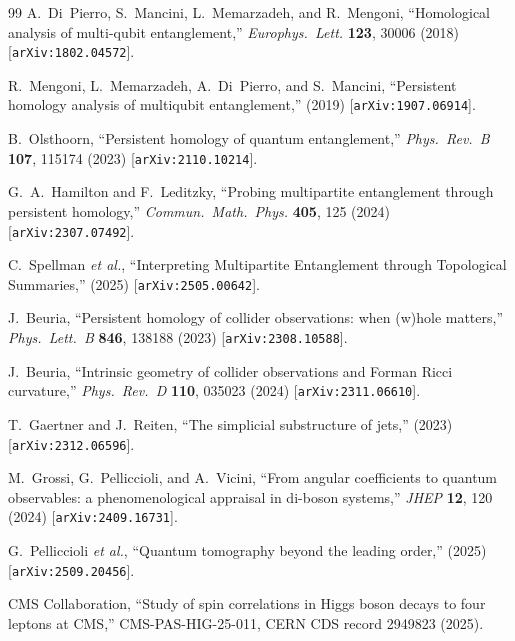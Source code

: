 \documentclass[11pt,a4paper]{article}
\theoremstyle{definition}
\begin{document}
\begin{thebibliography}{99}
A.~Di~Pierro, S.~Mancini, L.~Memarzadeh, and R.~Mengoni, ``Homological analysis of multi-qubit entanglement,'' \emph{Europhys.~Lett.} \textbf{123}, 30006 (2018) [\texttt{arXiv:1802.04572}].

R.~Mengoni, L.~Memarzadeh, A.~Di~Pierro, and S.~Mancini, ``Persistent homology analysis of multiqubit entanglement,'' (2019) [\texttt{arXiv:1907.06914}].

B.~Olsthoorn, ``Persistent homology of quantum entanglement,'' \emph{Phys.~Rev.~B} \textbf{107}, 115174 (2023) [\texttt{arXiv:2110.10214}].

G.~A.~Hamilton and F.~Leditzky, ``Probing multipartite entanglement through persistent homology,'' \emph{Commun.~Math.~Phys.} \textbf{405}, 125 (2024) [\texttt{arXiv:2307.07492}].

C.~Spellman \emph{et al.}, ``Interpreting Multipartite Entanglement through Topological Summaries,'' (2025) [\texttt{arXiv:2505.00642}].


J.~Beuria, ``Persistent homology of collider observations: when (w)hole matters,'' \emph{Phys.~Lett.~B} \textbf{846}, 138188 (2023) [\texttt{arXiv:2308.10588}].

J.~Beuria, ``Intrinsic geometry of collider observations and Forman Ricci curvature,'' \emph{Phys.~Rev.~D} \textbf{110}, 035023 (2024) [\texttt{arXiv:2311.06610}].

T.~Gaertner and J.~Reiten, ``The simplicial substructure of jets,'' (2023) [\texttt{arXiv:2312.06596}].


M.~Grossi, G.~Pelliccioli, and A.~Vicini, ``From angular coefficients to quantum observables: a phenomenological appraisal in di-boson systems,'' \emph{JHEP} \textbf{12}, 120 (2024) [\texttt{arXiv:2409.16731}].

G.~Pelliccioli \emph{et al.}, ``Quantum tomography beyond the leading order,'' (2025) [\texttt{arXiv:2509.20456}].


CMS Collaboration, ``Study of spin correlations in Higgs boson decays to four leptons at CMS,'' CMS-PAS-HIG-25-011, CERN CDS record 2949823 (2025).

\end{thebibliography}
\end{document}
